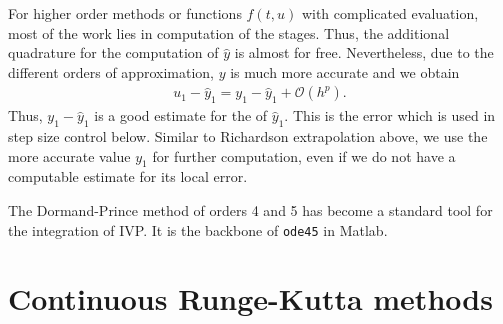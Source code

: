 

\begin{remark}
  For higher order methods or functions $f(t,u)$ with complicated
  evaluation, most of the work lies in computation of the
  stages. Thus, the additional quadrature for the computation of $\hat
  y$ is almost for free. Nevertheless, due to the different orders of
  approximation, $y$ is much more accurate and we obtain
  \begin{gather}
    \label{eq:explicit:29}
    u_1 - \hat y_1 = y_1 - \hat y_1 + \mathcal O(h^p).
  \end{gather}
  Thus, $y_1 - \hat y_1$ is a good estimate for the  of $\hat y_1$. This is the error which is used in step size
  control below. Similar to Richardson extrapolation above, we use the
  more accurate value $y_1$ for further computation, even if we do not
  have a computable estimate for its local error.
\end{remark}



\begin{remark}
  The Dormand-Prince method of orders 4 and 5 has become a standard
  tool for the integration of IVP. It is the backbone of
  \texttt{ode45} in Matlab.
\end{remark}

\section{Continuous Runge-Kutta methods}

